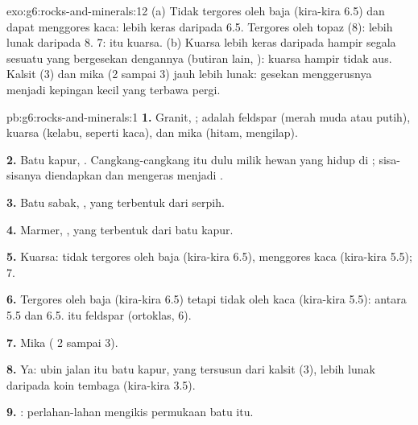 \begin{solution}{exo:g6:rocks-and-minerals:12}
(a) Tidak tergores oleh baja (kira-kira 6.5) dan dapat menggores kaca:
lebih keras daripada 6.5. Tergores oleh topaz (8): lebih lunak daripada 8.
 7:  itu kuarsa. (b) Kuarsa lebih keras daripada hampir
segala sesuatu yang bergesekan dengannya (butiran lain, ): kuarsa
hampir tidak aus. Kalsit (3) dan mika (2 sampai 3) jauh lebih lunak:
gesekan menggerusnya menjadi kepingan kecil yang terbawa pergi.
\end{solution}

\begin{solution}{pb:g6:rocks-and-minerals:1}
\textbf{1.} Granit, ;  adalah feldspar (merah muda atau
putih), kuarsa (kelabu, seperti kaca), dan mika (hitam, mengilap).

\textbf{2.} Batu kapur, . Cangkang-cangkang itu dulu milik
hewan yang hidup di ; sisa-sisanya diendapkan dan mengeras menjadi
.

\textbf{3.} Batu sabak, , yang terbentuk dari serpih.

\textbf{4.} Marmer, , yang terbentuk dari batu kapur.

\textbf{5.} Kuarsa: tidak tergores oleh baja (kira-kira 6.5), menggores
kaca (kira-kira 5.5);  7.

\textbf{6.} Tergores oleh baja (kira-kira 6.5) tetapi tidak oleh kaca
(kira-kira 5.5): antara 5.5 dan 6.5.  itu feldspar (ortoklas, 6).

\textbf{7.} Mika ( 2 sampai 3).

\textbf{8.} Ya: ubin jalan itu batu kapur, yang tersusun dari kalsit (3),
lebih lunak daripada koin tembaga (kira-kira 3.5).

\textbf{9.} :  perlahan-lahan mengikis permukaan batu itu.


\end{solution}
